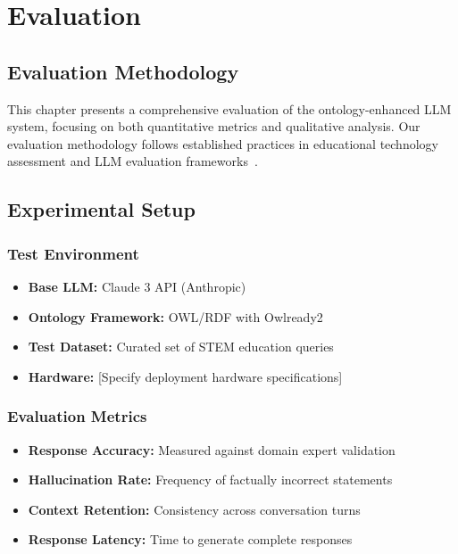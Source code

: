\chapter{Evaluation}
\label{chap:evaluation}

\section{Evaluation Methodology}
\label{sec:eval-methodology}

This chapter presents a comprehensive evaluation of the ontology-enhanced LLM system, focusing on both quantitative metrics and qualitative analysis. Our evaluation methodology follows established practices in educational technology assessment and LLM evaluation frameworks~\cite{huang2024survey}.

\section{Experimental Setup}
\label{sec:experimental-setup}

\subsection{Test Environment}
\begin{itemize}
    \item \textbf{Base LLM:} Claude 3 API (Anthropic)
    \item \textbf{Ontology Framework:} OWL/RDF with Owlready2
    \item \textbf{Test Dataset:} Curated set of STEM education queries
    \item \textbf{Hardware:} [Specify deployment hardware specifications]
\end{itemize}

\subsection{Evaluation Metrics}
\begin{itemize}
    \item \textbf{Response Accuracy:} Measured against domain expert validation
    \item \textbf{Hallucination Rate:} Frequency of factually incorrect statements
    \item \textbf{Context Retention:} Consistency across conversation turns
    \item \textbf{Response Latency:} Time to generate complete responses
\end{itemize}

